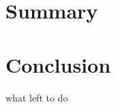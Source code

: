 \documentclass[%
 reprint,
 amsmath,amssymb,
 aps,
]{revtex4-2}
\begin{document}
\section{Summary}

\section{Conclusion}
what left to do



%
%
%
%
%
%
%
\end{document}
